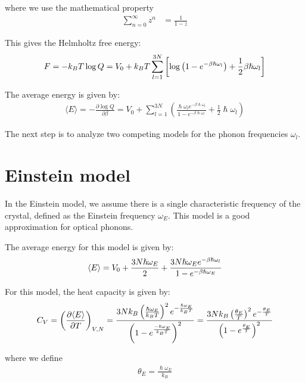 \documentclass[book.tex]{subfiles}
\begin{document}
\noindent where we use the mathematical property \begin{align}
\sum_{n=0}^\infty z^n &= \frac{1}{1 - z}
\end{align}

This gives the Helmholtz free energy:
\begin{align}
F = -k_BT\log Q = V_0 + k_BT \sum_{l=1}^{3N}\left[\log\left(1-e^{-\beta\hslash\omega_l}\right) + \frac{1}{2}\beta\hslash\omega_l \right] \notag
\end{align}

The average energy is given by:
\begin{align}\label{Eq.E_Phonons}
\langle E \rangle = -\frac{\partial \log Q}{\partial \beta} = V_0 + \sum_{l=1}^{3N} \left( \frac{\hslash\omega_le^{-\beta\hslash\omega_l}}{1 - e^{-\beta\hslash\omega_l}} + \frac{1}{2}\hslash\omega_l \right)
\end{align}

The next step is to analyze two competing models for the phonon frequencies $\omega_l$.

\section{Einstein model}
In the Einstein model, we assume there is a single characteristic
frequency of the crystal, defined as the Einstein frequency $\omega_E$. This model is a good approximation for optical phonons.

The average energy for this model is given by:
\begin{align}
\langle E \rangle = V_0 + \frac{3N\hslash\omega_E}{2} + \frac{3N\hslash\omega_Ee^{-\beta\hslash\omega_l}}{1-e^{-\beta\hslash\omega_E}} \notag	
\end{align}

For this model, the heat capacity is given by:
\begin{align}
C_V = \left( \frac{\partial \langle E \rangle}{\partial T} \right)_{V,N} =  \frac{3Nk_B \left( \frac{\hslash\omega_E}{k_BT} \right) ^2 e^{-\frac{\hslash\omega_E}{k_BT}}}{\left(1-e^{\frac{-\hslash\omega_E}{k_BT}}\right)^2} = \frac{3Nk_B \left( \frac{\theta_E}{T} \right) ^2 e^{-\frac{\theta_E}{T}}}{\left(1-e^{\frac{\theta_E}{T}}\right)^2} \notag
\end{align}

\noindent where we define 
\begin{align}
\theta_E = \frac{\hslash\omega_E}{k_B}
\end{align}
\end{document}
